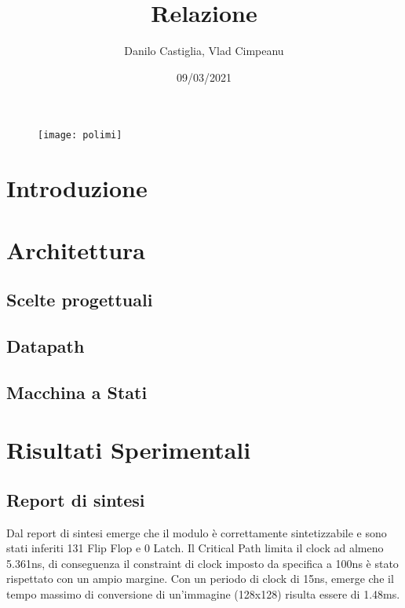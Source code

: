 \documentclass{article}
\title{Relazione}
\date{09/03/2021}
\author{Danilo Castiglia, Vlad Cimpeanu}
\begin{document}
\maketitle
{}


\begin{figure}[h!] %
\centering
  \texttt{[image: polimi]}
  \label{fig:polimi}
\end{figure}

\newpage

\section{Introduzione}


\section{Architettura}
\subsection{Scelte progettuali}

\newpage
\subsection{Datapath}

\subsection{Macchina a Stati}

\section{Risultati Sperimentali}
\subsection{Report di sintesi}
Dal report di sintesi emerge che il modulo è correttamente sintetizzabile e sono stati inferiti 131 Flip Flop e 0 Latch. Il Critical Path limita il clock ad almeno 5.361ns, di conseguenza il constraint di clock imposto da specifica a 100ns è stato rispettato con un ampio margine.
Con un periodo di clock di 15ns, emerge che il tempo massimo di conversione di un'immagine (128x128) risulta essere di 1.48ms.
\end{document}
